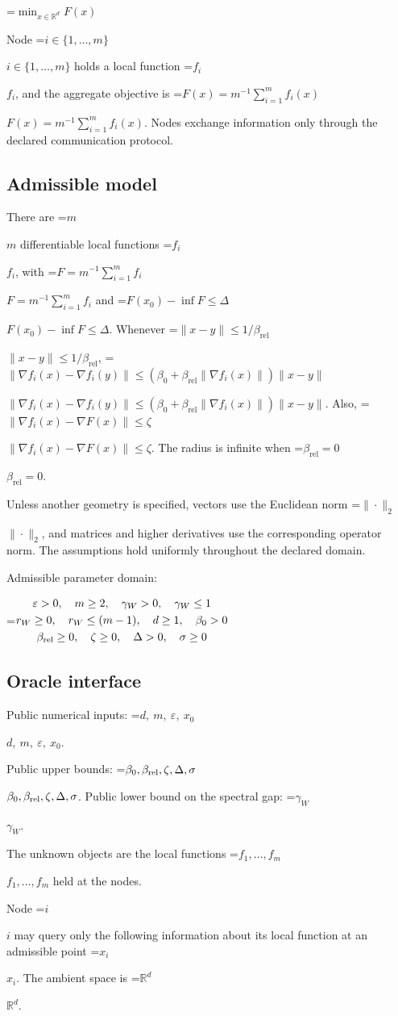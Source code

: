 \documentclass[10pt,a4paper]{article}
\newcommand{\AtlasMath}[1]{\par\begingroup\centering\setbox0=\hbox{$\displaystyle #1$}\ifdim\wd0>1.4\linewidth\typeout{ATLAS WIDE FORMULA: \the\wd0}\fi\ifdim\wd0>\linewidth\resizebox{\linewidth}{!}{\box0}\else\box0\fi\par\endgroup}
\newcommand{\AtlasInlineMath}[1]{\begingroup\setbox0=\hbox{$#1$}\ifdim\wd0>.4\linewidth\endgroup\AtlasMath{#1}\else\endgroup$#1$\fi}
\begin{document}
\AtlasMath{\min_{x\in \mathbb{R}^d}F(x)}


Node \AtlasInlineMath{i\in\{1,\ldots,m\}} holds a local function \AtlasInlineMath{f_i}, and the aggregate objective is \AtlasInlineMath{F(x)=m^{-1}\sum_{i=1}^m f_i(x)}. Nodes exchange information only through the declared communication protocol.

\subsection{Admissible model}
There are \AtlasInlineMath{m} differentiable local functions \AtlasInlineMath{f_i}, with \AtlasInlineMath{F=m^{-1}\sum_{i=1}^m f_i} and \AtlasInlineMath{F(x_0)-\inf F\le\Delta}. Whenever \AtlasInlineMath{\|x-y\|\le1/\beta_{\mathrm{rel}}}, \AtlasInlineMath{\|\nabla f_i(x)-\nabla f_i(y)\|\le(\beta_0+\beta_{\mathrm{rel}}\|\nabla f_i(x)\|)\|x-y\|}. Also, \AtlasInlineMath{\|\nabla f_i(x)-\nabla F(x)\|\le\zeta}. The radius is infinite when \AtlasInlineMath{\beta_{\mathrm{rel}}=0}.

Unless another geometry is specified, vectors use the Euclidean norm \AtlasInlineMath{\|\cdot\|_2}, and matrices and higher derivatives use the corresponding operator norm. The assumptions hold uniformly throughout the declared domain.

Admissible parameter domain:


\AtlasMath{\begin{gathered}\varepsilon > 0,\quad m \ge 2,\quad \gamma_W > 0,\quad \gamma_W \le 1\\r_W \ge 0,\quad r_W \le (m-1),\quad d \ge 1,\quad \beta_0 > 0\\\beta_{\rm rel} \ge 0,\quad \zeta \ge 0,\quad \Delta > 0,\quad \sigma \ge 0\end{gathered}}


\subsection{Oracle interface}
Public numerical inputs: \AtlasInlineMath{d,\ m,\ \varepsilon,\ x_0}.

Public upper bounds: \AtlasInlineMath{\beta_0,\beta_{\rm rel},\zeta,\Delta,\sigma}. Public lower bound on the spectral gap: \AtlasInlineMath{\gamma_W}.

The unknown objects are the local functions \AtlasInlineMath{f_1,\ldots,f_m} held at the nodes.

Node \AtlasInlineMath{i} may query only the following information about its local function at an admissible point \AtlasInlineMath{x_i}. The ambient space is \AtlasInlineMath{\mathbb R^d}.
\end{document}
